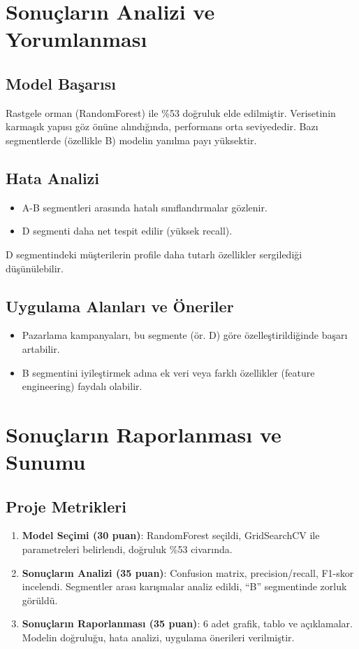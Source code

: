 \documentclass{article}
\begin{document}
\section{Sonuçların Analizi ve Yorumlanması}

\subsection{Model Başarısı}

Rastgele orman (RandomForest) ile \%53 doğruluk elde edilmiştir. Verisetinin karmaşık yapısı göz önüne alındığında, performans orta seviyededir. Bazı segmentlerde (özellikle B) modelin yanılma payı yüksektir.

\subsection{Hata Analizi}

\begin{itemize}
    \item A-B segmentleri arasında hatalı sınıflandırmalar gözlenir.
    \item D segmenti daha net tespit edilir (yüksek recall).
\end{itemize}
D segmentindeki müşterilerin profile daha tutarlı özellikler sergilediği düşünülebilir.

\subsection{Uygulama Alanları ve Öneriler}

\begin{itemize}
    \item Pazarlama kampanyaları, bu segmente (ör. D) göre özelleştirildiğinde başarı artabilir.
    \item B segmentini iyileştirmek adına ek veri veya farklı özellikler (feature engineering) faydalı olabilir.
\end{itemize}

\section{Sonuçların Raporlanması ve Sunumu}

\subsection{Proje Metrikleri}

\begin{enumerate}
    \item \textbf{Model Seçimi (30 puan)}: RandomForest seçildi, GridSearchCV ile parametreleri belirlendi, doğruluk \%53 civarında.
    \item \textbf{Sonuçların Analizi (35 puan)}: Confusion matrix, precision/recall, F1-skor incelendi. Segmentler arası karışmalar analiz edildi, “B” segmentinde zorluk görüldü.
    \item \textbf{Sonuçların Raporlanması (35 puan)}: 6 adet grafik, tablo ve açıklamalar. Modelin doğruluğu, hata analizi, uygulama önerileri verilmiştir.
\end{enumerate}
\end{document}
